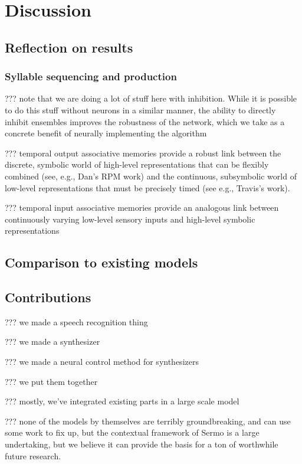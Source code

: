 \chapter{Discussion}

\section{Reflection on results}

\subsection{Syllable sequencing and production}

??? note that we are doing a lot of stuff
here with inhibition.
While it is possible to do this stuff
without neurons in a similar manner,
the ability to directly inhibit ensembles
improves the robustness of the network,
which we take as a concrete benefit
of neurally implementing the algorithm

??? temporal output associative memories
provide a robust link between the discrete,
symbolic world of high-level representations
that can be flexibly combined (see, e.g., Dan's RPM work)
and the continuous, subsymbolic world
of low-level representations that must
be precisely timed (see e.g., Travis's work).

??? temporal input associative memories
provide an analogous link between
continuously varying low-level sensory inputs
and high-level symbolic representations

\section{Comparison to existing models}

\section{Contributions}

??? we made a speech recognition thing

??? we made a synthesizer

??? we made a neural control method for synthesizers

??? we put them together

??? mostly, we've integrated existing parts in a large scale model

??? none of the models by themselves are terribly groundbreaking,
and can use some work to fix up,
but the contextual framework of Sermo
is a large undertaking,
but we believe it can provide the basis
for a ton of worthwhile future research.

